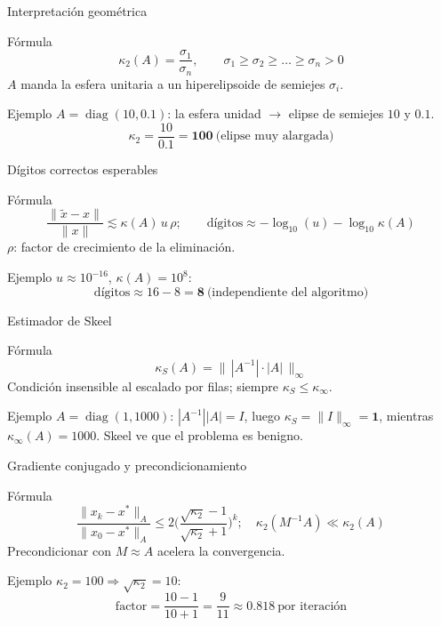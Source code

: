 \documentclass[aspectratio=169,10pt]{beamer}
\begin{document}
\begin{frame}{Interpretación geométrica}
\begin{cardidea}{Fórmula}{\faSuperscript}
\[ \kappa_2(A)=\frac{\sigma_1}{\sigma_n},\qquad \sigma_1\ge\sigma_2\ge\dots\ge\sigma_n>0 \]
$A$ manda la esfera unitaria a un hiperelipsoide de semiejes $\sigma_i$.
\end{cardidea}
\vspace{1.5mm}
\begin{cardgear}{Ejemplo}{\faCalculator}
$A=\operatorname{diag}(10,0.1)$: la esfera unidad $\to$ elipse de semiejes $10$ y $0.1$.
\[ \kappa_2=\frac{10}{0.1}=\mathbf{100}\ \text{(elipse muy alargada)} \]
\end{cardgear}
\end{frame}

\begin{frame}{Dígitos correctos esperables}
\begin{cardidea}{Fórmula}{\faSuperscript}
\[ \frac{\|\tilde x-x\|}{\|x\|}\lesssim \kappa(A)\,u\,\rho;\qquad \text{dígitos}\approx -\log_{10}(u)-\log_{10}\kappa(A) \]
$\rho$: factor de crecimiento de la eliminación.
\end{cardidea}
\vspace{1.5mm}
\begin{cardgear}{Ejemplo}{\faCalculator}
$u\approx10^{-16}$, $\kappa(A)=10^{8}$:
\[ \text{dígitos}\approx 16-8=\mathbf{8}\ \text{(independiente del algoritmo)} \]
\end{cardgear}
\end{frame}

\begin{frame}{Estimador de Skeel}
\begin{cardidea}{Fórmula}{\faSuperscript}
\[ \kappa_S(A)=\big\|\,|A^{-1}|\cdot|A|\,\big\|_\infty \]
Condición insensible al escalado por filas; siempre $\kappa_S\le \kappa_\infty$.
\end{cardidea}
\vspace{1.5mm}
\begin{cardgear}{Ejemplo}{\faCalculator}
$A=\operatorname{diag}(1,1000)$: $|A^{-1}||A|=I$, luego $\kappa_S=\|I\|_\infty=\mathbf{1}$,
mientras $\kappa_\infty(A)=1000$. Skeel ve que el problema es benigno.
\end{cardgear}
\end{frame}

\begin{frame}{Gradiente conjugado y precondicionamiento}
\begin{cardidea}{Fórmula}{\faSuperscript}
\[ \frac{\|x_k-x^*\|_A}{\|x_0-x^*\|_A}\le 2\Big(\frac{\sqrt{\kappa_2}-1}{\sqrt{\kappa_2}+1}\Big)^{k};\quad \kappa_2(M^{-1}A)\ll\kappa_2(A) \]
Precondicionar con $M\approx A$ acelera la convergencia.
\end{cardidea}
\vspace{1.5mm}
\begin{cardgear}{Ejemplo}{\faCalculator}
$\kappa_2=100\Rightarrow\sqrt{\kappa_2}=10$:
\[ \text{factor}=\frac{10-1}{10+1}=\frac{9}{11}\approx \mathbf{0.818}\ \text{por iteración} \]
\end{cardgear}
\end{frame}
\end{document}
